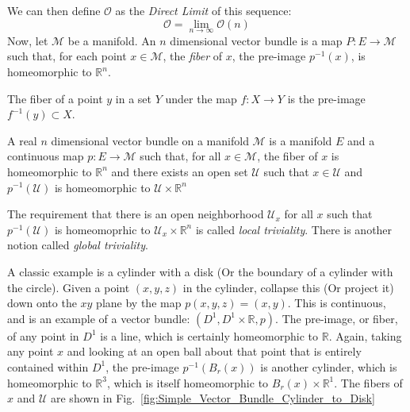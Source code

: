             We can then define $\mathcal{O}$ as the
            \textit{Direct Limit} of this sequence:
            \begin{equation*}
                \mathcal{O}=\underset{n\rightarrow\infty}{\lim}\mathcal{O}(n)
            \end{equation*}
            Now, let $\mathcal{M}$ be a manifold. An $n$ dimensional vector
            bundle is a map $P:E\rightarrow\mathcal{M}$ such that, for each
            point $x\in\mathcal{M}$, the \textit{fiber} of $x$, the pre-image
            $p^{-1}(x)$, is homeomorphic to $\mathbb{R}^{n}$.
            \begin{definition}
                The fiber of a point $y$ in a set $Y$ under the map
                $f:X\rightarrow{Y}$ is the pre-image $f^{-1}(y)\subset{X}$.
            \end{definition}
            \begin{definition}
                A real $n$ dimensional vector bundle on a manifold $\mathcal{M}$
                is a manifold $E$ and a continuous map
                $p:E\rightarrow\mathcal{M}$ such that, for all
                $x\in\mathcal{M}$, the fiber of $x$ is homeomorphic to
                $\mathbb{R}^{n}$ and there exists an open set $\mathcal{U}$
                such that $x\in\mathcal{U}$ and $p^{-1}(\mathcal{U})$ is
                homeomorphic to $\mathcal{U}\times\mathbb{R}^{n}$
            \end{definition}
            The requirement that there is an open neighborhood $\mathcal{U}_{x}$
            for all $x$ such that $p^{-1}(\mathcal{U})$ is homeomoprhic to
            $\mathcal{U}_{x}\times\mathbb{R}^{n}$ is called
            \textit{local triviality}. There is another notion called
            \textit{global triviality}.
            \begin{example}
                A classic example is a cylinder with a disk (Or the boundary of
                a cylinder with the circle). Given a point $(x,y,z)$ in the
                cylinder, collapse this (Or project it) down onto the $xy$
                plane by the map $p(x,y,z)=(x,y)$. This is continuous, and is
                an example of a vector bundle:
                $(D^{1},D^{1}\times\mathbb{R},p)$. The pre-image, or fiber, of
                any point in $D^{1}$ is a line, which is certainly homeomorphic
                to $\mathbb{R}$. Again, taking any point $x$ and looking at an
                open ball about that point that is entirely contained within
                $D^{1}$, the pre-image $p^{-1}(B_{r}(x))$ is another cylinder,
                which is homeomorphic to $\mathbb{R}^{3}$, which is itself
                homeomorphic to $B_{r}(x)\times\mathbb{R}^{1}$. The fibers of
                $x$ and $\mathcal{U}$ are shown in
                Fig.~\ref{fig:Simple_Vector_Bundle_Cylinder_to_Disk}
            \end{example}
